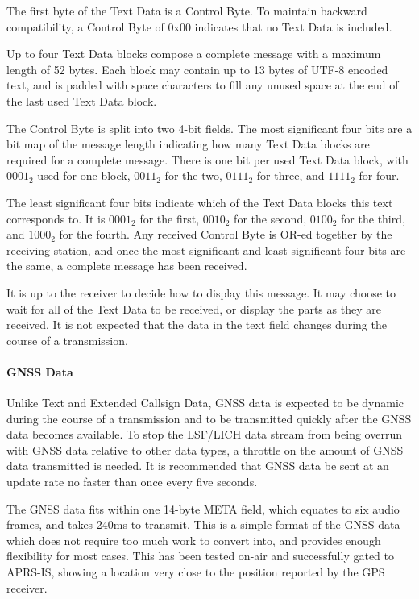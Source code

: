 \documentclass[a4paper,11pt,oneside]{book}
\begin{document}
The first byte of the Text Data is a Control Byte. To maintain backward compatibility, a Control Byte of 0x00 indicates that no Text Data is included.

Up to four Text Data blocks compose a complete message with a maximum length of 52 bytes. Each block may contain up to 13 bytes of UTF-8 encoded text, and is padded with space characters to fill any unused space at the end of the last used Text Data block.

The Control Byte is split into two 4-bit fields. The most significant four bits are a bit map of the message length indicating how many Text Data blocks are required for a complete message. There is one bit per used Text Data block, with $0001_2$ used for one block, $0011_2$ for the two, $0111_2$ for three, and $1111_2$ for four.

The least significant four bits indicate which of the Text Data blocks this text corresponds to. It is $0001_2$ for the first, $0010_2$ for the second, $0100_2$ for the third, and $1000_2$ for the fourth. Any received Control Byte is OR-ed together by the receiving station, and once the most significant and least significant four bits are the same, a complete message has been received.

It is up to the receiver to decide how to display this message. It may choose to wait for all of the Text Data to be received, or display the parts as they are received. It is not expected that the data in the text field changes during the course of a transmission.

\paragraph{GNSS Data}

Unlike Text and Extended Callsign Data, GNSS data is expected to be dynamic during the course of a transmission and to be transmitted quickly after the GNSS data becomes available. To stop the LSF/LICH data stream from being overrun with GNSS data relative to other data types, a throttle on the amount of GNSS data transmitted is needed. It is recommended that GNSS data be sent at an update rate no faster than once every five seconds.

The GNSS data fits within one 14-byte META field, which equates to six audio frames, and takes 240ms to transmit. This is a simple format of the GNSS data which does not require too much work to convert into, and provides enough flexibility for most cases. This has been tested on-air and successfully gated to APRS-IS, showing a location very close to the position reported by the GPS receiver.
\end{document}
